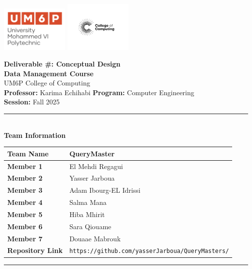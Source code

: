 \documentclass[a4paper,12pt]{article}
\begin{document}
\thispagestyle{empty}
\begin{center}
  \includegraphics[width=0.25\textwidth]{Figures/UM6Plogo.png}\hfill
  \includegraphics[width=0.25\textwidth]{Figures/CC.jpg}
  \vspace{1.2cm}

  {\LARGE \textbf{Deliverable \#: Conceptual Design}}\\[0.6cm]
  {\large \textbf{Data Management Course}}\\[0.2cm]
  {\large UM6P College of Computing}\\[0.8cm]

  {\normalsize \textbf{Professor:} Karima Echihabi \quad 
   \textbf{Program:} Computer Engineering}\\[0.1cm]
  {\normalsize \textbf{Session:} Fall 2025}\\[1cm]

  \rule{0.9\textwidth}{0.5pt}\\[0.5cm]
  {\large \textbf{Team Information}} \\[0.3cm]
  \begin{tabular}{|l|l|}
    \hline
    \textbf{Team Name} & QueryMaster \\ \hline
    \textbf{Member 1}  & El Mehdi Regagui  \\ \hline
    \textbf{Member 2}  & Yasser Jarboua   \\ \hline
    \textbf{Member 3}  & Adam Ibourg-EL Idrissi   \\ \hline
    \textbf{Member 4}  & Salma Mana   \\ \hline
    \textbf{Member 5}  & Hiba Mhirit   \\ \hline
    \textbf{Member 6}  & Sara Qiouame   \\ \hline
    \textbf{Member 7}  & Douaae Mabrouk   \\ \hline
    \textbf{Repository Link} & \texttt{https://github.com/yasserJarboua/QueryMasters/} \\ \hline
  \end{tabular}
  \rule{0.9\textwidth}{0.5pt}\\
\end{center}
\clearpage
\pagestyle{fancy}
\end{document}
